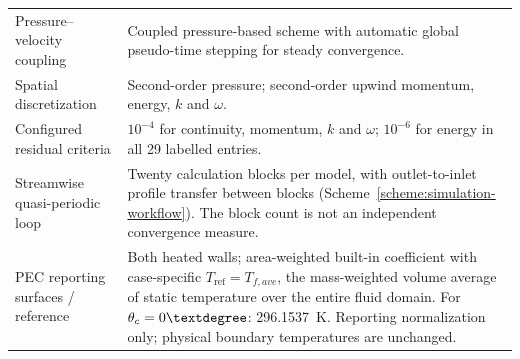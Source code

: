 \begin{longtable}{@{}p{}p{}@{}}
Pressure--velocity coupling & Coupled pressure-based scheme with automatic global pseudo-time stepping for steady convergence.\\
Spatial discretization & Second-order pressure; second-order upwind momentum, energy, $k$ and $\omega$.\\
Configured residual criteria & $10^{-4}$ for continuity, momentum, $k$ and $\omega$; $10^{-6}$ for energy in all 29 labelled entries. \\
Streamwise quasi-periodic loop & Twenty calculation blocks per model, with outlet-to-inlet profile transfer between blocks (Scheme~\ref{scheme:simulation-workflow}). The block count is not an independent convergence measure.\\
PEC reporting surfaces / reference & Both heated walls; area-weighted built-in coefficient with case-specific $T_{\mathrm{ref}}=T_{f,ave}$, the mass-weighted volume average of static temperature over the entire fluid domain. For $\theta_c=0\degree$: 296.1537~K. Reporting normalization only; physical boundary temperatures are unchanged.\\
\end{longtable}
\endgroup
